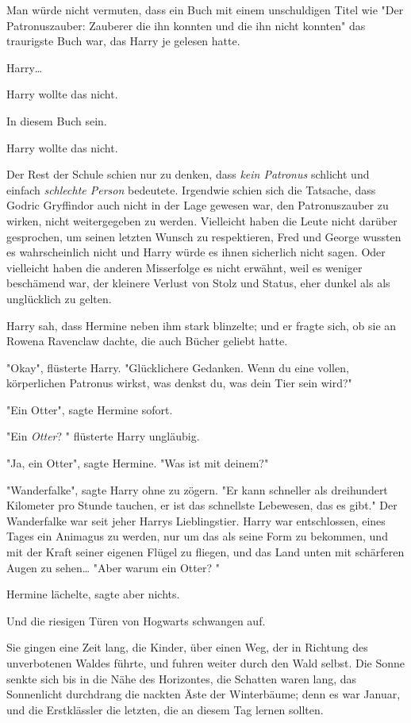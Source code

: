 {Man würde nicht vermuten, dass ein Buch mit einem unschuldigen Titel wie "Der Patronuszauber: Zauberer die ihn konnten und die ihn nicht konnten" das traurigste Buch war, das Harry je gelesen hatte.

Harry…

Harry wollte das nicht.

In diesem Buch sein.

Harry wollte das nicht.

Der Rest der Schule schien nur zu denken, dass \emph{kein Patronus} schlicht und einfach \emph{schlechte Person} bedeutete. Irgendwie schien sich die Tatsache, dass Godric Gryffindor auch nicht in der Lage gewesen war, den Patronuszauber zu wirken, nicht weitergegeben zu werden. Vielleicht haben die Leute nicht darüber gesprochen, um seinen letzten Wunsch zu respektieren, Fred und George wussten es wahrscheinlich nicht und Harry würde es ihnen sicherlich nicht sagen. Oder vielleicht haben die anderen Misserfolge es nicht erwähnt, weil es weniger beschämend war, der kleinere Verlust von Stolz und Status, eher dunkel als als unglücklich zu gelten.

Harry sah, dass Hermine neben ihm stark blinzelte; und er fragte sich, ob sie an Rowena Ravenclaw dachte, die auch Bücher geliebt hatte.

"Okay", flüsterte Harry. "Glücklichere Gedanken. Wenn du eine vollen, körperlichen Patronus wirkst, was denkst du, was dein Tier sein wird?"

"Ein Otter", sagte Hermine sofort.

"Ein \emph{Otter}? " flüsterte Harry ungläubig.

"Ja, ein Otter", sagte Hermine. "Was ist mit deinem?"

"Wanderfalke", sagte Harry ohne zu zögern. "Er kann schneller als dreihundert Kilometer pro Stunde tauchen, er ist das schnellste Lebewesen, das es gibt." Der Wanderfalke war seit jeher Harrys Lieblingstier. Harry war entschlossen, eines Tages ein Animagus zu werden, nur um das als seine Form zu bekommen, und mit der Kraft seiner eigenen Flügel zu fliegen, und das Land unten mit schärferen Augen zu sehen… "Aber warum ein Otter? "

Hermine lächelte, sagte aber nichts.

Und die riesigen Türen von Hogwarts schwangen auf.

Sie gingen eine Zeit lang, die Kinder, über einen Weg, der in Richtung des unverbotenen Waldes führte, und fuhren weiter durch den Wald selbst. Die Sonne senkte sich bis in die Nähe des Horizontes, die Schatten waren lang, das Sonnenlicht durchdrang die nackten Äste der Winterbäume; denn es war Januar, und die Erstklässler die letzten, die an diesem Tag lernen sollten.

}
